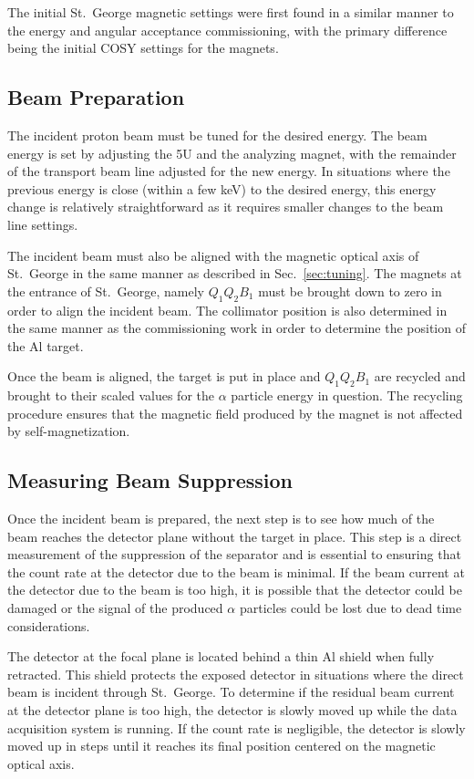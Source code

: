 The initial St.\ George magnetic settings were first found in a similar
manner to the energy and angular acceptance commissioning, with the
primary difference being the initial COSY settings for the magnets.

\subsection{Beam Preparation}

The incident proton beam must be tuned for the desired energy. The beam
energy is set by adjusting the 5U and the analyzing magnet, with the
remainder of the transport beam line adjusted for the new energy. In
situations where the previous energy is close (within a few keV) to the
desired energy, this energy change is relatively straightforward as it
requires smaller changes to the beam line settings.

The incident beam must also be aligned with the magnetic optical axis of
St.\ George in the same manner as described in Sec.~\ref{sec:tuning}.
The magnets at the entrance of St.\ George, namely $Q_1Q_2B_1$ must be
brought down to zero in order to align the incident beam. The collimator
position is also determined in the same manner as the commissioning work
in order to determine the position of the Al target.

Once the beam is aligned, the target is put in place and $Q_1Q_2B_1$ are
recycled and brought to their scaled values for the $\alpha$ particle
energy in question. The recycling procedure ensures that the magnetic
field produced by the magnet is not affected by self-magnetization.

\subsection{Measuring Beam Suppression}

Once the incident beam is prepared, the next step is to see how much of
the beam reaches the detector plane without the target in place. This
step is a direct measurement of the suppression of the separator and is
essential to ensuring that the count rate at the detector due to the
beam is minimal. If the beam current at the detector due to the beam is
too high, it is possible that the detector could be damaged or the
signal of the produced $\alpha$ particles could be lost due to dead time
considerations.

The detector at the focal plane is located behind a thin Al shield when
fully retracted. This shield protects the exposed detector in situations
where the direct beam is incident through St.\ George. To determine if
the residual beam current at the detector plane is too high, the
detector is slowly moved up while the data acquisition system is
running. If the count rate is negligible, the detector is slowly moved
up in steps until it reaches its final position centered on the magnetic
optical axis.

